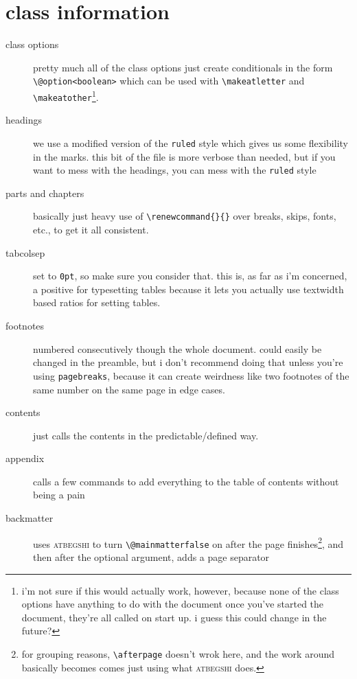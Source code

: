 \documentclass[lowerhead,12pt]{aesthetic}
\begin{document}
\section[class information]{class information\protect\footnotemark}\label{sec:aesinfo}
\begin{description}
    \item[class options] pretty much all of the class options just create conditionals in the form \verb|\@option<boolean>| which can be used with \verb|\makeatletter| and \verb|\makeatother|\footnote{i'm not sure if this would actually work, however, because none of the class options have anything to do with the document once you've started the document, they're all called on start up. i guess this could change in the future?}.
    \item[headings] we use a modified version of the \texttt{ruled} style which gives us some flexibility in the marks. this bit of the file is more verbose than needed, but if you want to mess with the headings, you can mess with the \texttt{ruled} style
    \item[parts and chapters] basically just heavy use of \verb|\renewcommand{}{}| over breaks, skips, fonts, etc., to get it all consistent.
    \item[tabcolsep] set to \texttt{0pt}, so make sure you consider that. this is, as far as i'm concerned, a positive for typesetting tables because it lets you actually use textwidth based ratios for setting tables.
    \item[footnotes] numbered consecutively though the whole document. could easily be changed in the preamble, but i don't recommend doing that unless you're using \texttt{pagebreaks}, because it can create weirdness like two footnotes of the same number on the same page in edge cases.
    \item[contents] just calls the contents in the predictable/defined way.
    \item[appendix] calls a few commands to add everything to the table of contents without being a pain
    \item[backmatter] uses {\scshape\ttfamily atbegshi} to turn \texttt{\textbackslash @mainmatterfalse} on after the page finishes\footnote{for grouping reasons, \texttt{\textbackslash afterpage} doesn't wrok here, and the work around basically becomes comes just using what {\scshape\ttfamily atbegshi} does.}, and then after the optional argument, adds a page separator
\end{description}

\makeappendix
\makebackmatter
\end{document}
